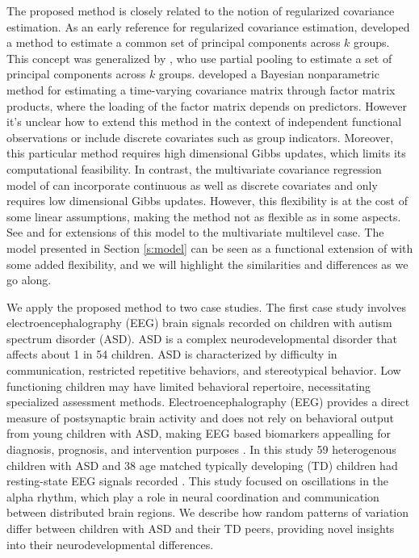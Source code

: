 \documentclass[useAMS,referee,usenatbib]{biom}
\begin{document}
The proposed method is closely related to the notion of regularized covariance estimation. As an early reference for regularized covariance estimation, \citet{Flury1984} developed a method to estimate a common set of principal components across $k$ groups. This concept was generalized by \citet{Franks2019}, who use partial pooling to estimate a set of principal components across $k$ groups. \citet{Fox2015} developed a Bayesian nonparametric method for estimating a time-varying covariance matrix through factor matrix products, where the loading of the factor matrix depends on predictors. However it's unclear how to extend this method in the context of independent functional observations or include discrete covariates such as group indicators. Moreover, this particular method requires high dimensional Gibbs updates, which limits its computational feasibility. In contrast, the multivariate covariance regression model of \citet{Hoff2012} can incorporate continuous as well as discrete covariates and only requires low dimensional Gibbs updates. However, this flexibility is at the cost of some linear assumptions, making the method not as flexible as \citet{Fox2015} in some aspects. See \citet{Li2014} and \citet{Quintero2017} for extensions of this model to the multivariate multilevel case. The model presented in Section \ref{s:model} can be seen as a functional extension of \citet{Hoff2012} with some added flexibility, and we will highlight the similarities and differences as we go along. 

We apply the proposed method to two case studies. The first case study involves electroencephalography (EEG) brain signals recorded on children with autism spectrum disorder (ASD). ASD is a complex neurodevelopmental disorder that affects about 1 in 54 children. ASD is characterized by difficulty in communication, restricted repetitive behaviors, and stereotypical behavior. Low functioning children may have limited behavioral repertoire, necessitating specialized assessment methods.  Electroencephalography (EEG) provides a direct measure of postsynaptic brain activity and does not rely on behavioral output from young children with ASD, making EEG based biomarkers appealling for diagnosis, prognosis, and intervention purposes \citep*{Jeste2015}. In this study 59 heterogenous children with ASD and 38 age matched typically developing (TD) children had resting-state EEG signals recorded \citep*{Dickinson2017}. This study focused on oscillations in the alpha rhythm, which play a role in neural coordination and communication between distributed brain regions. We describe how random patterns of variation differ between children with ASD and their TD peers, providing novel insights into their neurodevelopmental differences.
\end{document}
